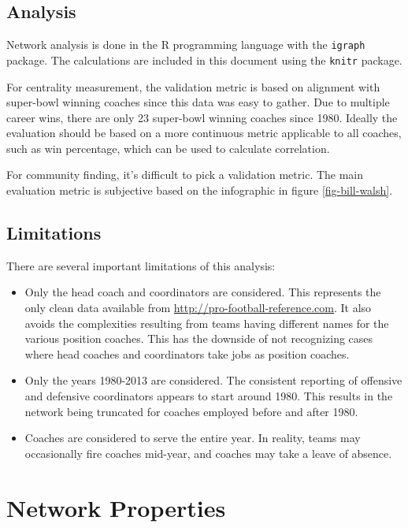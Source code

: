 \documentclass[11pt]{article}\usepackage[]{graphicx}\usepackage[]{color}
\begin{document}
\subsection{Analysis}

Network analysis is done in the R programming language with the {\tt igraph}
package.  The calculations are included in this document using the {\tt knitr}
package.

For centrality measurement, the validation metric is based on alignment with
super-bowl winning coaches since this data was easy to gather.  Due to multiple
career wins, there are only 23 super-bowl winning coaches since 1980.  Ideally
the evaluation should be based on a more continuous metric applicable to all
coaches, such as win percentage, which can be used to calculate correlation.

For community finding, it's difficult to pick a validation metric.  The main
evaluation metric is subjective based on the infographic in figure
\ref{fig-bill-walsh}.

\subsection{Limitations}

There are several important limitations of this analysis:

\begin{itemize}

\item Only the head coach and coordinators are considered.  This represents the
only clean data available from \url{http://pro-football-reference.com}.  It
also avoids the complexities resulting from teams having different names for
the various position coaches.  This has the downside of not recognizing cases
where head coaches and coordinators take jobs as position coaches.

\item Only the years 1980-2013 are considered.  The consistent reporting of
offensive and defensive coordinators appears to start around 1980.  This
results in the network being truncated for coaches employed before and after
1980.

\item Coaches are considered to serve the entire year.  In reality, teams may
occasionally fire coaches mid-year, and coaches may take a leave of absence.


\end{itemize}

\section{Network Properties}
\end{document}
